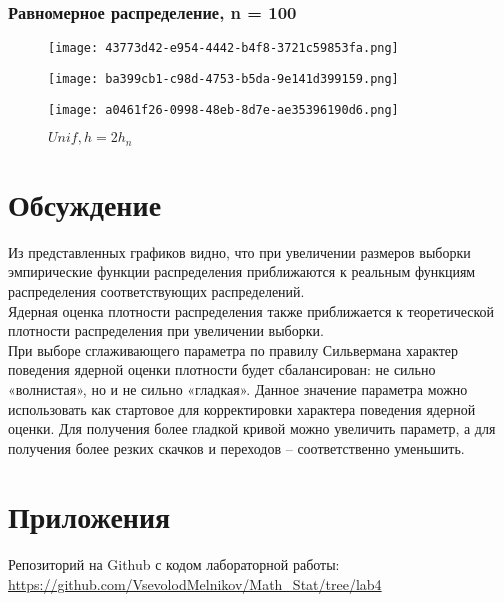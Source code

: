 \subsubsection{Равномерное распределение, n = 100}
\begin{figure}[!htb]
  \texttt{[image: 43773d42-e954-4442-b4f8-3721c59853fa.png]}
  \caption{\(Unif, h=h_n/2\)}
\endminipage\hfill
{}
  \texttt{[image: ba399cb1-c98d-4753-b5da-9e141d399159.png]}
  \caption{\(Unif, h=h_n\)}
\endminipage\hfill
{}
  \texttt{[image: a0461f26-0998-48eb-8d7e-ae35396190d6.png]}
  \caption{\(Unif, h=2h_n\)}
\endminipage
\label{fig:unif100}
\end{figure}
\newpage

\section{Обсуждение}
Из представленных графиков видно, что при увеличении размеров выборки эмпирические функции распределения приближаются к реальным функциям распределения соответствующих распределений.\\
Ядерная оценка плотности распределения также приближается к теоретической плотности распределения при увеличении выборки.\\
При выборе сглаживающего параметра по правилу Сильвермана характер поведения ядерной оценки плотности будет сбалансирован: не сильно «волнистая», но и не сильно «гладкая».  Данное значение параметра можно использовать как стартовое для корректировки характера поведения ядерной оценки. Для получения более гладкой кривой можно увеличить параметр, а для получения более резких скачков и переходов – соответственно уменьшить.

\section{Приложения}
Репозиторий на Github с кодом лабораторной работы:\\
\url{https://github.com/VsevolodMelnikov/Math_Stat/tree/lab4}


